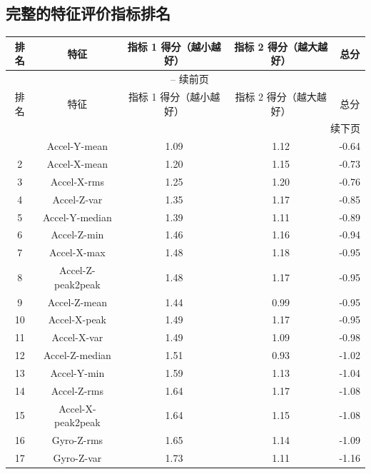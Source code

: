 \documentclass[withoutpreface]{cumcmthesis}
\begin{document}
\newpage

\begin{appendices} %

\section{完整的特征评价指标排名}
\label{appendix:feature-ranking}

\begin{longtable}{|c|c|c|c|c|}
    \hline
    排名 & 特征 & 指标 1 得分（越小越好） & 指标 2 得分（越大越好） & 总分 \\ \hline
    \endfirsthead
    \multicolumn{5}{c}{{\tablename\ \thetable{} -- 续前页}} \\
    \hline
    排名 & 特征 & 指标 1 得分（越小越好） & 指标 2 得分（越大越好） & 总分 \\ \hline
    \endhead
    \hline
    \multicolumn{5}{r}{{续下页}} \\
    \endfoot
    \hline
    \endlastfoot
    1 & Accel-Y-mean & 1.09 & 1.12 & -0.64 \\ \hline
    2 & Accel-X-mean & 1.20 & 1.15 & -0.73 \\ \hline
    3 & Accel-X-rms & 1.25 & 1.20 & -0.76 \\ \hline
    4 & Accel-Z-var & 1.35 & 1.17 & -0.85 \\ \hline
    5 & Accel-Y-median & 1.39 & 1.11 & -0.89 \\ \hline
    6 & Accel-Z-min & 1.46 & 1.16 & -0.94 \\ \hline
    7 & Accel-X-max & 1.48 & 1.18 & -0.95 \\ \hline
    8 & Accel-Z-peak2peak & 1.48 & 1.17 & -0.95 \\ \hline
    9 & Accel-Z-mean & 1.44 & 0.99 & -0.95 \\ \hline
    10 & Accel-X-peak & 1.49 & 1.17 & -0.95 \\ \hline
    11 & Accel-X-var & 1.49 & 1.09 & -0.98 \\ \hline
    12 & Accel-Z-median & 1.51 & 0.93 & -1.02 \\ \hline
    13 & Accel-Y-min & 1.59 & 1.13 & -1.04 \\ \hline
    14 & Accel-Z-rms & 1.64 & 1.17 & -1.08 \\ \hline
    15 & Accel-X-peak2peak & 1.64 & 1.15 & -1.08 \\ \hline
    16 & Gyro-Z-rms & 1.65 & 1.14 & -1.09 \\ \hline
    17 & Gyro-Z-var & 1.73 & 1.11 & -1.16 \\ \hline

\end{longtable}
\end{appendices}
\end{document}
